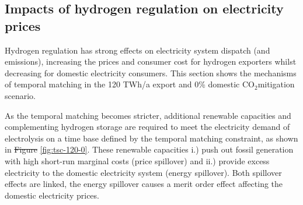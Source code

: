 \documentclass[5p,numafflabel]{elsarticle}
\newcommand{\co}{\ce{CO2}~}
\def\co{CO${}_2${\:}}
\providecommand{\DIFaddtex}[1]{{\protect\color{blue}\uwave{#1}}} %
\providecommand{\DIFdeltex}[1]{{\protect\color{red}\sout{#1}}}                      %
\providecommand{\DIFaddbegin}{} %
\providecommand{\DIFaddend}{} %
\providecommand{\DIFdelbegin}{} %
\providecommand{\DIFdelend}{} %
\providecommand{\DIFadd}[1]{\texorpdfstring{\DIFaddtex{#1}}{#1}} %
\providecommand{\DIFdel}[1]{\texorpdfstring{\DIFdeltex{#1}}{}} %
\newcommand{\DIFscaledelfig}{0.5}
\newlength{\DIFdelgraphicswidth} %
\newlength{\DIFdelgraphicsheight} %
\newcommand{\DIFaddincludegraphics}[2][]{{\color{blue}\fbox{\DIFOincludegraphics[#1]{#2}}}} %
\newcommand{\DIFdelincludegraphics}[2][]{%
\sbox{\DIFdelgraphicsbox}{\DIFOincludegraphics[#1]{#2}}%
\settoboxwidth{\DIFdelgraphicswidth}{\DIFdelgraphicsbox} %
\settoboxtotalheight{\DIFdelgraphicsheight}{\DIFdelgraphicsbox} %
\scalebox{\DIFscaledelfig}{%
\parbox[b]{\DIFdelgraphicswidth}{\usebox{\DIFdelgraphicsbox}\\[-\baselineskip] \rule{\DIFdelgraphicswidth}{0em}}\llap{\resizebox{\DIFdelgraphicswidth}{\DIFdelgraphicsheight}{%
\setlength{\unitlength}{\DIFdelgraphicswidth}%
\begin{picture}(1,1)%
\thicklines\linethickness{2pt} %
{\color[rgb]{1,0,0}\put(0,0){\framebox(1,1){}}}%
{\color[rgb]{1,0,0}\put(0,0){\line( 1,1){1}}}%
{\color[rgb]{1,0,0}\put(0,1){\line(1,-1){1}}}%
\end{picture}%
}\hspace*{3pt}}} %
} %
\DeclareRobustCommand{\DIFaddbegin}{\DIFOaddbegin \let\includegraphics\DIFaddincludegraphics} %
\DeclareRobustCommand{\DIFaddend}{\DIFOaddend \let\includegraphics\DIFOincludegraphics} %
\DeclareRobustCommand{\DIFdelbegin}{\DIFOdelbegin \let\includegraphics\DIFdelincludegraphics} %
\DeclareRobustCommand{\DIFdelend}{\DIFOaddend \let\includegraphics\DIFOincludegraphics} %
\begin{document}





\subsection*{Impacts of hydrogen regulation on electricity prices}
\label{subsec:benefits_rule}

Hydrogen regulation has strong effects on electricity system dispatch (and emissions), increasing the prices and consumer cost for hydrogen exporters whilst decreasing for domestic electricity consumers. This section shows the mechanisms of temporal matching in the 120 TWh/a export and 0\% domestic \co mitigation scenario.

As the temporal matching becomes stricter, additional renewable capacities and complementing hydrogen storage are required to meet the electricity demand of electrolysis
on a time base defined by the temporal matching constraint, as shown in \DIFdelbegin \DIFdel{Figure }\DIFdelend \DIFaddbegin \DIFadd{Supplementary Fig. }\DIFaddend \ref{fig:tsc-120-0}. These renewable capacities i.) push out fossil generation with high short-run marginal costs (price spillover) and ii.) provide excess electricity to the domestic electricity system (energy spillover). Both spillover effects are linked, the energy spillover causes a merit order effect affecting the domestic electricity prices.
\end{document}
